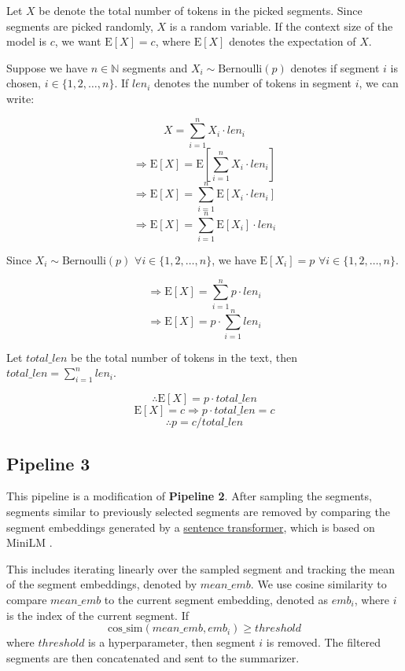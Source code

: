 Let $X$ be denote the total number of tokens in the picked segments.
Since segments are picked randomly, $X$ is a random variable.
If the context size of the model is $c$, we want $\mathrm{E}[X] = c$, where $\mathrm{E}[X]$
denotes the expectation of $X$.

Suppose we have $n \in \mathbb{N}$ segments and $X_i \sim \mathrm{Bernoulli}(p)$ denotes
if segment $i$ is chosen, $i \in \{1, 2, \dots, n\}$.
If $len_i$ denotes the number of tokens in segment $i$, we can write:

\[ X = \sum_{i = 1}^{n} X_i \cdot len_i \]
\[ \Rightarrow \mathrm{E}[X] = \mathrm{E}[\sum_{i = 1}^{n} X_i \cdot len_i] \]
\[ \Rightarrow \mathrm{E}[X] = \sum_{i = 1}^{n} \mathrm{E}[X_i \cdot len_i] \]
\[ \Rightarrow \mathrm{E}[X] = \sum_{i = 1}^{n} \mathrm{E}[X_i] \cdot len_i \]

Since $X_i \sim \mathrm{Bernoulli}(p)$ $\forall i \in \{1, 2, \dots, n\}$, we
have $\mathrm{E}[X_i] = p$ $\forall i \in \{1, 2, \dots, n\}$.

\[ \Rightarrow \mathrm{E}[X] = \sum_{i = 1}^{n} p \cdot len_i \]
\[ \Rightarrow \mathrm{E}[X] = p \cdot \sum_{i = 1}^{n} len_i \]

Let $total\_len$ be the total number of tokens in the text, then
$total\_len = \sum_{i = 1}^{n} len_i$.

\[ \therefore \mathrm{E}[X] = p \cdot total\_len \]
\[ \mathrm{E}[X] = c \Rightarrow p \cdot total\_len = c \]
\[ \therefore p = c / total\_len \]


\subsection*{Pipeline 3}

This pipeline is a modification of \textbf{Pipeline 2}.
After sampling the segments, segments similar to previously selected segments are removed
by comparing the segment embeddings generated by a
\href{https://huggingface.co/sentence-transformers/all-MiniLM-L6-v2}{sentence transformer},
which is based on MiniLM \cite{wang2020minilm}.

This includes iterating linearly over the sampled segment and tracking the mean of the segment
embeddings, denoted by $mean\_emb$.
We use cosine similarity to compare $mean\_emb$ to the current segment embedding,
denoted as $emb_i$, where $i$ is the index of the current segment.
If \[ \mathrm{cos\_sim}(mean\_emb, emb_i) \ge threshold \]
where $threshold$ is a hyperparameter, then segment $i$ is removed.
The filtered segments are then concatenated and sent to the summarizer.


